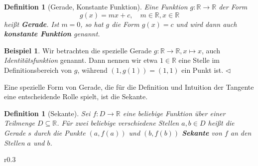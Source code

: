 \documentclass[11pt,reqno, a4paper]{book}
\renewcommand{\textbf}[1]{{\normalfont\bf #1}}
\theoremstyle{mystyle}
\newtheorem{definition}[theorem]{Definition}
\theoremstyle{definition}
\newtheorem{exampleth}[theorem]{Beispiel}
\newenvironment{example}{\begin{exampleth}}{\hspace{\fill}$\triangleleft$\end{exampleth}}
\numberwithin{equation}{chapter}
\begin{document}
\begin{definition}[Gerade, Konstante Funktion]
    Eine Funktion \(g:\mathbb R \to \mathbb R\) der Form 
    \begin{equation*}
        g(x) = mx + c, \quad m \in \mathbb R, x \in \mathbb R
    \end{equation*}
    heißt \textbf{Gerade}. Ist \(m=0\), so hat \(g\) die Form \(g(x) = c\) und wird dann auch \textbf{konstante Funktion} genannt. 
\end{definition}

\begin{example}
    Wir betrachten die spezielle Gerade \(g:\mathbb R \to \mathbb R, x \mapsto x\), auch \textit{Identitätsfunktion} genannt. Dann nennen wir etwa \(1\in \mathbb R\) eine Stelle im Definitionsbereich von \(g\), während \((1,g(1)) = (1,1)\) ein Punkt ist. 
\end{example}

Eine spezielle Form von Gerade, die für die Definition und Intuition der Tangente eine entscheidende Rolle spielt, ist die Sekante.
\begin{definition}[Sekante]
    Sei \(f: D \to \mathbb R\) eine beliebige Funktion über einer Teilmenge \(D\subseteq \mathbb R\). Für zwei beliebige verschiedene Stellen $a, b \in D$ heißt die Gerade \(s\) durch die Punkte \((a,f(a))\) und \((b,f(b))\) \textbf{Sekante} von \(f\) an den Stellen \(a\) und \(b\). 
\end{definition}

\begin{wrapfigure}{r}{0.3\textwidth}
    \begin{center}
    \end{center}
\end{wrapfigure}
\end{document}
